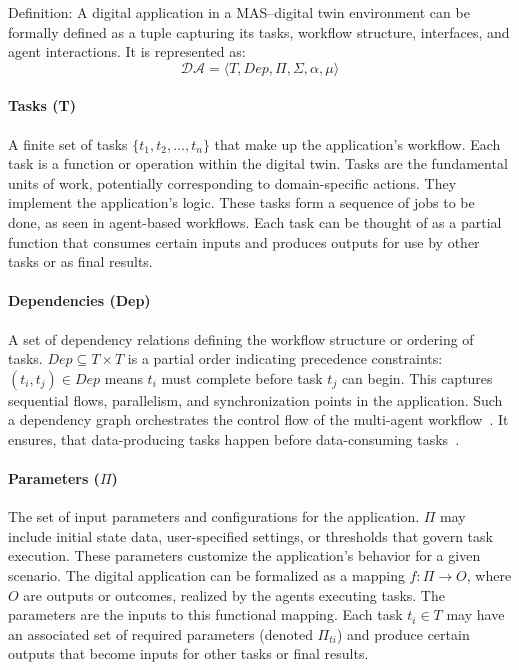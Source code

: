 Definition: A digital application in a MAS–digital twin environment can be formally defined as a tuple capturing its tasks, workflow structure, interfaces, and agent interactions. It is represented as:
\[
\mathcal{DA} = \langle T, Dep, \Pi, \Sigma, \alpha, \mu \rangle
\]


\paragraph{Tasks (T)} A finite set of tasks $\{t_1, t_2, \ldots, t_n\}$ that make up the application’s workflow. Each task is a function or operation within the digital twin. Tasks are the fundamental units of work, potentially corresponding to domain-specific actions. They implement the application’s logic. These tasks form a sequence of jobs to be done, as seen in agent-based workflows. Each task can be thought of as a partial function that consumes certain inputs and produces outputs for use by other tasks or as final results.

\paragraph{Dependencies (Dep)} A set of dependency relations defining the workflow structure or ordering of tasks. $Dep\subseteq T \times T$ is a partial order indicating precedence constraints: $(t_i,t_j) \in Dep $ means $t_i$ must complete before task $t_j$ can begin. This captures sequential flows, parallelism, and synchronization points in the application. Such a dependency graph orchestrates the control flow of the multi-agent workflow~\cite{Kotb_WorkflowNetCooperative}. It ensures, that data-producing tasks happen before data-consuming tasks~\cite{Kotb_WorkflowNetCooperative}.

\paragraph{Parameters ($\Pi$)} The set of input parameters and configurations for the application. $\Pi$ may include initial state data, user-specified settings, or thresholds that govern task execution. These parameters customize the application’s behavior for a given scenario. The digital application can be formalized as a mapping $f : \Pi \rightarrow O$, where $O$ are outputs or outcomes, realized by the agents executing tasks. The parameters are the inputs to this functional mapping. Each task $t_i \in T$ may have an associated set of required parameters (denoted $\Pi_{ti}$) and produce certain outputs that become inputs for other tasks or final results.

